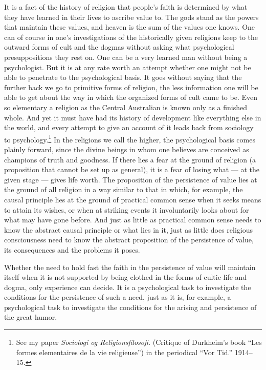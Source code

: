 \documentclass[12pt]{book}
\newcommand{\opage}[1]{\marginnote{\footnotesize\textit{[#1]}}}
\begin{document}
It is a fact of the history of religion that people's faith is determined by what they have
learned in their lives to ascribe value to. The gods stand as the powers that maintain these
values, and heaven is the sum of the values one knows. One can of course in one's
investigations of the historically given religions keep to the outward forms of cult and the
dogmas without asking what psychological presuppositions they rest on. One can be a very
learned man without being a psychologist. But it is at any rate worth an attempt whether one
might not be able to penetrate to the psychological basis. It goes without saying that the
further back we go to primitive forms of religion, the less information one will be able to
get about the way in which the organized forms of cult came to be. Even so elementary a
religion as the Central Australian is known only as a finished whole. And yet it must have had
its history of development like everything else in the world, \opage{110}and every attempt
to give an account of it leads back from sociology to psychology.\footnote{See my paper
\textit{Sociologi og Religionsfilosofi.} (Critique of Durkheim's book ``Les formes
elementaires de la vie religieuse'') in the periodical ``Vor Tid.'' 1914--15.} In the
religions we call the higher, the psychological basis comes plainly forward, since the divine
beings in whom one believes are conceived as champions of truth and goodness. If there lies a
fear at the ground of religion (a proposition that cannot be set up as general), it is a fear
of losing what --- at the given stage --- gives life worth. The proposition of the persistence
of value lies at the ground of all religion in a way similar to that in which, for example,
the causal principle lies at the ground of practical common sense when it seeks means to
attain its wishes, or when at striking events it involuntarily looks about for what may have
gone before. And just as little as practical common sense needs to know the abstract causal
principle or what lies in it, just as little does religious consciousness need to know the
abstract proposition of the persistence of value, its consequences and the problems it poses.

Whether the need to hold fast the faith in the persistence of value will maintain itself when
it is not supported by being clothed in the forms of cultic life and dogma, only experience
can decide. It is a psychological task to investigate the conditions for the persistence of
such a need, just as it is, for example, a psychological task to investigate the conditions
for the arising and persistence of the great humor.
\end{document}
